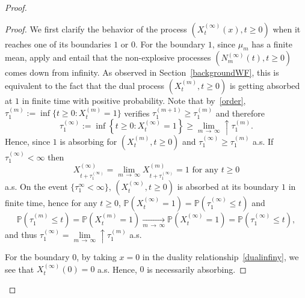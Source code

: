 \documentclass[AHL,Unicode,longabstracts,published]{cedram}
\newcommand{\bbP}{\mathbb{P}}
\begin{document}
\begin{proof}
\begin{proof}
We first clarify the behavior of the process $(X^{(\infty)}_t(x),t\geq 0)$ when it reaches one of its boundaries $1$ or $0$. For the boundary $1$, since $\mu_m$ has a finite mean, \cite[Corollary~1.4 and Remark~1.5]{cdiEFC} apply and entail that the non-explosive processes $(N^{(\infty)}_m(t),t\geq 0)$ comes down from infinity. As observed in Section~\ref{backgroundWF}, this is equivalent to the fact that the dual process $(X_t^{(m)},t\geq 0)$ is getting absorbed at $1$ in finite time with positive probability. Note that by~\eqref{order}, $\tau_1^{(m)}:=\inf\{t\geq 0: X_t^{(m)}=1\}$ verifies $\tau_1^{(m+1)}\geq \tau_1^{(m)}$ and therefore
\[
\tau_1^{(\infty)}:=\inf\left\{t\geq 0: X^{(\infty)}_t=1\right\}\geq \underset{m\,\rightarrow\,\infty}{\lim}\uparrow \tau_1^{(m)}.
\]
Hence, since $1$ is absorbing for $(X_t^{(m)},t\geq 0)$ and $\tau_1^{(\infty)}\geq \tau_1^{(m)}$ a.s. If $\tau_1^{(\infty)}<\infty$ then 
\[
X^{(\infty)}_{t+\tau_1^{(\infty)}}=\underset{m\,\rightarrow\,\infty}{\lim} X^{(m)}_{t+\tau_1^{(\infty)}}=1 \text{ for any } t\geq 0
\]
a.s. On the event $\{\tau_1^{\infty}<\infty\}$, $(X^{(\infty)}_t,t\geq 0)$ is absorbed at its boundary $1$ in finite time, hence for any $t\geq 0$, $\bbP(X^{(\infty)}_t=1)=\bbP(\tau_1^{(\infty)}\leq t)$ and
\[
\bbP\left(\tau_1^{(m)}\leq t\right)=\bbP\left(X^{(m)}_t=1\right)\underset{m\,\rightarrow\,\infty}{\longrightarrow} \bbP(X^{(\infty)}_t=1)=\bbP(\tau_1^{(\infty)}\leq t),
\]
and thus $\tau_1^{(\infty)}=\underset{m\,\rightarrow\,\infty}{\lim}\uparrow \tau_1^{(m)}$ a.s.

For the boundary $0$, by taking $x=0$ in the duality relationship~\eqref{dualinfiny}, we see that $X_t^{(\infty)}(0)=0$ a.s. Hence, $0$ is necessarily absorbing.


\end{proof}
\end{proof}
\end{document}
